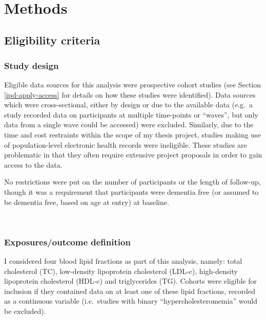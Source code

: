 \documentclass[a4paper, twoside]{templates/ociamthesis}
\begin{document}
~

\hypertarget{methods-2}{%
\section{Methods}\label{methods-2}}

\hypertarget{eligibility-criteria-1}{%
\subsection{Eligibility criteria}\label{eligibility-criteria-1}}

\hypertarget{study-design}{%
\subsubsection{Study design}\label{study-design}}

Eligible data sources for this analysis were prospective cohort studies (see Section \ref{ipd-apply-access} for details on how these studies were identified). Data sources which were cross-sectional, either by design or due to the available data (e.g.~a study recorded data on participants at multiple time-points or ``waves'', but only data from a single wave could be accessed) were excluded. Similarly, due to the time and cost restraints within the scope of my thesis project, studies making use of population-level electronic health records were ineligible. These studies are problematic in that they often require extensive project proposals in order to gain access to the data.

No restrictions were put on the number of participants or the length of follow-up, though it was a requirement that participants were dementia free (or assumed to be dementia free, based on age at entry) at baseline.

~

\hypertarget{exposuresoutcome-definition}{%
\subsubsection{Exposures/outcome definition}\label{exposuresoutcome-definition}}

I considered four blood lipid fractions as part of this analysis, namely: total cholesterol (TC), low-density lipoprotein cholesterol (LDL-c), high-density lipoprotein cholesterol (HDL-c) and triglycerides (TG). Cohorts were eligible for inclusion if they contained data on at least one of these lipid fractions, recorded as a continuous variable (i.e.~studies with binary ``hypercholesteromemia'' would be excluded).
\end{document}
